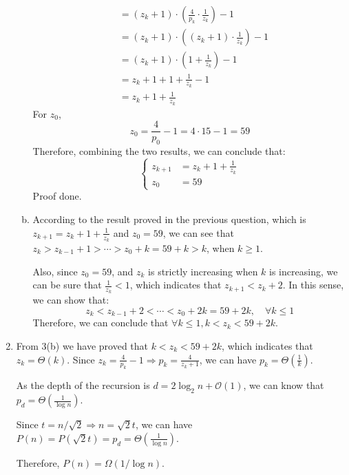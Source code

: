 \documentclass[12pt, a4paper]{article}
\begin{document}
\begin{enumerate}
\begin{enumerate}[a)]
\begin{align*}
                          &= (z_k + 1) \cdot (\frac{4}{p_k}\cdot \frac{1}{z_k}) - 1\\
                          &= (z_k + 1)\cdot ((z_k + 1)\cdot \frac{1}{z_k}) - 1\\
                          &= (z_k + 1)\cdot (1 + \frac{1}{z_k}) - 1\\
                          &= z_k + 1 + 1 + \frac{1}{z_k} - 1\\
                          &= z_k + 1 + \frac{1}{z_k}
              \end{align*}
              For $z_0$, 
              \[z_0 = \frac{4}{p_0} - 1 = 4\cdot 15 - 1 = 59\]
              Therefore, combining the two results, we can conclude that:
              \[
              \begin{cases}
                  z_{k+1} &= z_k + 1 + \frac{1}{z_k}\\
                  z_0 &= 59
              \end{cases}
              \]
              Proof done.
        \item According to the result proved in the previous question, which is $z_{k+1} = z_k + 1 + \frac{1}{z_k}$ and $z_0 = 59$, we can see that $z_k > z_{k-1} + 1 > \cdots > z_{0} + k = 59 + k > k$, when $k \geq 1$.
              
              Also, since $z_0 = 59$, and $z_k$ is strictly increasing when $k$ is increasing, we can be sure that $\frac{1}{z_k} < 1$, which indicates that $z_{k+1} < z_k + 2$. In this sense, we can show that:
              \[z_k < z_{k-1} + 2 < \cdots < z_0 + 2k = 59 + 2k, \quad \forall k \leq 1\]
              Therefore, we can conclude that $\forall k \leq 1, k < z_k < 59 + 2k$.
    \end{enumerate}
    \item From 3(b) we have proved that $k < z_k < 59 + 2k$, which indicates that $z_k = \Theta(k)$. Since $z_k = \frac{4}{p_k} - 1 \Rightarrow p_k = \frac{4}{z_k + 1}$, we can have $p_k = \Theta(\frac{1}{k})$.
          
          As the depth of the recursion is $d = 2\log_2 n + \mathcal{O}(1)$, we can know that $p_{d} = \Theta(\frac{1}{\log n})$.

          Since $t = n / \sqrt{2} \Rightarrow n = \sqrt{2}t$, we can have $P(n) = P(\sqrt{2}t) = p_d = \Theta(\frac{1}{\log n})$. 

          Therefore, $P(n) = \Omega(1 / \log n)$.
\end{enumerate}
\end{document}
